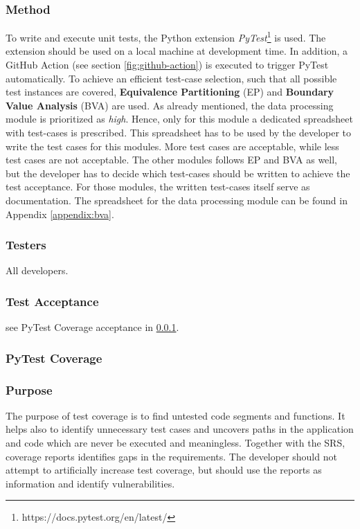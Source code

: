 \documentclass[a4paper]{article}
\begin{document}
\subsubsection*{Method}
To write and execute unit tests, the Python extension \textit{PyTest}\footnote{https://docs.pytest.org/en/latest/} is used. The extension should be used on a local machine at development time. In addition, a GitHub Action (see section \ref{fig:github-action}) is executed to trigger PyTest automatically. To achieve an efficient test-case selection, such that all possible test instances are covered, \textbf{Equivalence Partitioning} (EP) and \textbf{Boundary Value Analysis} (BVA) are used.
\newline
\newline
As already mentioned, the data processing module is prioritized as \textit{high}. Hence, only for this module a dedicated spreadsheet with test-cases is prescribed. This spreadsheet has to be used by the developer to write the test cases for this modules. More test cases are acceptable, while less test cases are not acceptable. The other modules follows EP and BVA as well, but the developer has to decide which test-cases should be written to achieve the test acceptance. For those modules, the written test-cases itself serve as documentation. The spreadsheet for the data processing module can be found in Appendix \ref{appendix:bva}.


\subsubsection*{Testers}
All developers.

\subsubsection*{Test Acceptance}
see PyTest Coverage acceptance in \ref{sec:pytest-cov}.



\subsubsection{PyTest Coverage}
\label{sec:pytest-cov}
\subsubsection*{Purpose}
The purpose of test coverage is to find untested code segments and functions. It helps also to identify unnecessary test cases and uncovers paths in the application and code which are never be executed and meaningless. Together with the SRS, coverage reports identifies gaps in the requirements. The developer should not attempt to artificially increase test coverage, but should use the reports as information and identify vulnerabilities.
\end{document}
